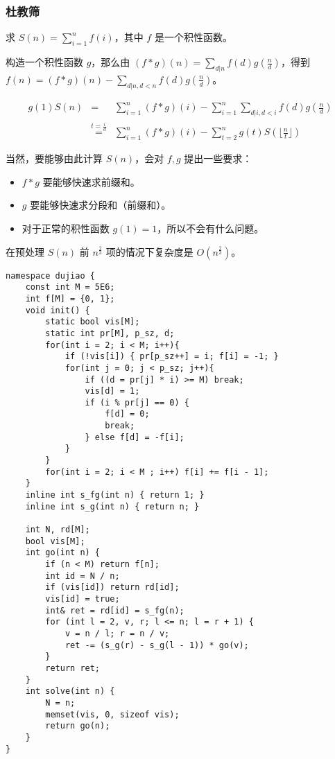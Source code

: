 \documentclass[]{article}
\providecommand{\tightlist}{%
  \setlength{\itemsep}{0pt}\setlength{\parskip}{0pt}}
\begin{document}
\hypertarget{ux675cux6559ux7b5b}{%
\subsubsection{杜教筛}\label{ux675cux6559ux7b5b}}

求 \(S(n)=\sum_{i=1}^n f(i)\)，其中 \(f\) 是一个积性函数。

构造一个积性函数 \(g\)，那么由
\((f*g)(n)=\sum_{d|n}f(d)g(\frac{n}{d})\)，得到
\(f(n)=(f*g)(n)-\sum_{d|n,d<n}f(d)g(\frac{n}{d})\)。

\begin{eqnarray}
g(1)S(n)&=&\sum_{i=1}^n (f*g)(i)-\sum_{i= 1}^{n}\sum_{d|i,d<i}f(d)g(\frac{n}{d}) \\
&\overset{t=\frac{i}{d}}{=}& \sum_{i=1}^n (f*g)(i)-\sum_{t=2}^{n} g(t) S(\lfloor \frac{n}{t} \rfloor)
\end{eqnarray}

当然，要能够由此计算 \(S(n)\)，会对 \(f,g\) 提出一些要求：

\begin{itemize}
\tightlist
\item
  \(f*g\) 要能够快速求前缀和。
\item
  \(g\) 要能够快速求分段和（前缀和）。
\item
  对于正常的积性函数 \(g(1)=1\)，所以不会有什么问题。
\end{itemize}

在预处理 \(S(n)\) 前 \(n^{\frac{2}{3}}\) 项的情况下复杂度是
\(O(n^{\frac{2}{3}})\)。

\begin{verbatim}
namespace dujiao {
    const int M = 5E6;
    int f[M] = {0, 1};
    void init() {
        static bool vis[M];
        static int pr[M], p_sz, d;
        for(int i = 2; i < M; i++){
            if (!vis[i]) { pr[p_sz++] = i; f[i] = -1; }
            for(int j = 0; j < p_sz; j++){
                if ((d = pr[j] * i) >= M) break;
                vis[d] = 1;
                if (i % pr[j] == 0) {
                    f[d] = 0;
                    break;
                } else f[d] = -f[i];
            }
        }
        for(int i = 2; i < M ; i++) f[i] += f[i - 1];
    }
    inline int s_fg(int n) { return 1; }
    inline int s_g(int n) { return n; }

    int N, rd[M];
    bool vis[M];
    int go(int n) {
        if (n < M) return f[n];
        int id = N / n;
        if (vis[id]) return rd[id];
        vis[id] = true;
        int& ret = rd[id] = s_fg(n);
        for (int l = 2, v, r; l <= n; l = r + 1) {
            v = n / l; r = n / v;
            ret -= (s_g(r) - s_g(l - 1)) * go(v);
        }
        return ret;
    }
    int solve(int n) {
        N = n;
        memset(vis, 0, sizeof vis);
        return go(n);
    }
}
\end{verbatim}
\end{document}
